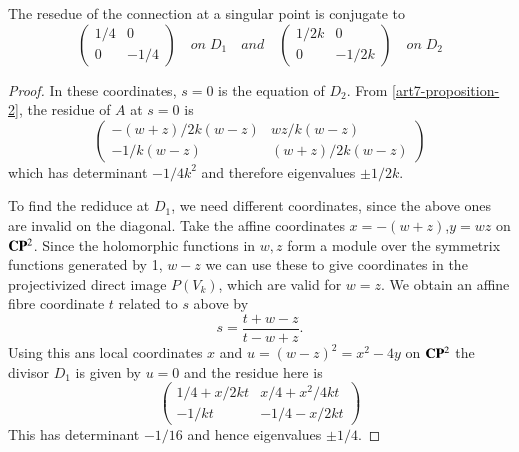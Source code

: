 \begin{proposition}\label{art7-proposition-4}
The resedue of the connection at a singular point is conjugate to
$$
\left(
\begin{matrix}
1/4 & 0\\
0 & -1/4
\end{matrix}
\right)
\quad 
on\; D_{1} \quad and \quad
\left(
\begin{matrix}
1/2k & 0\\
0 & -1/2k
\end{matrix}
\right)
\quad on \; D_{2}
$$
\end{proposition}

 \begin{proof}
In these coordinates, $s=0$ is the equation of $D_{2}$. From \eqref{art7-proposition-2}, the residue of $A$ at $s=0$ is
\begin{equation*}\label{art7-eq-13}
\left(
\begin{matrix}
-(w+z)/2k(w-z) & wz/k(w-z)\\
-1/k(w-z) & (w+z)/2k(w-z)
\end{matrix}
\right)\tag{13}
\end{equation*}
which has determinant $-1/4k^{2}$ and therefore eigenvalues $\pm1/2k$.

To find the rediduce at $D_{1}$, we need different coordinates, since the above ones are invalid on the diagonal. Take the affine coordinates $x=-(w+z)$,\pageoriginale $y=wz$ on $\mathbf{C}\mathbf{P}^{2}$. Since the holomorphic functions in $w, z$ form a module over the symmetrix functions generated by 1, $w -z$ we can use these to give  coordinates in the projectivized direct image $P(V_{k})$, which are valid for $w=z$. We obtain an affine fibre coordinate $t$ related to $s$ above by
$$
s = \dfrac{t+w-z}{t-w+z}.
$$
Using this ans local coordinates $x$ and  $u= (w-z)^{2} =x^{2}-4y$ on $\mathbf{C}\mathbf{P}^{2}$ the divisor $D_{1}$ is given by $u=0$ and the residue here is
\begin{equation*}\label{art7-eq-14}
\left(
\begin{matrix}
1/4+x/2kt & x/4+x^{2}/4kt\\
-1/kt & -1/4-x/2kt
\end{matrix}
\right)\tag{14}
\end{equation*}
This has determinant $-1/16$ and hence eigenvalues $\pm1/4$.
 \end{proof}

